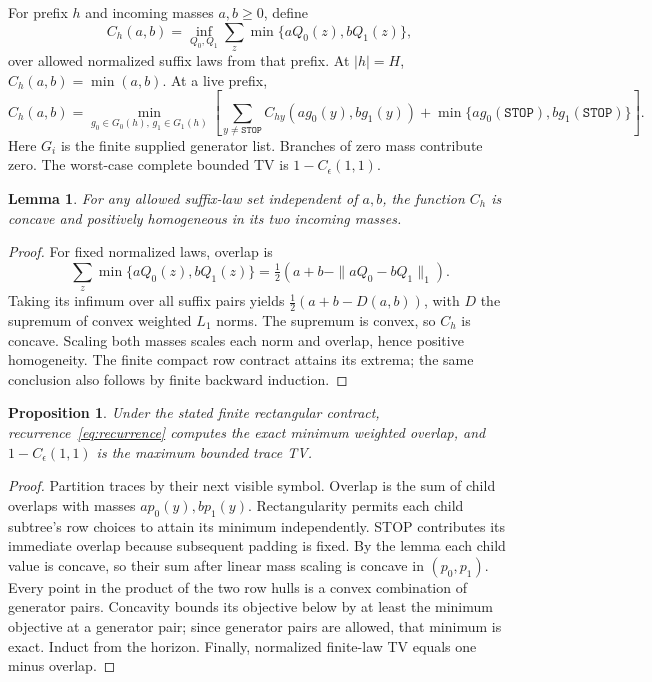 \documentclass[11pt,a4paper]{article}
\newcommand{\STOP}{\mathtt{STOP}}
\newtheorem{proposition}{Proposition}
\newtheorem{lemma}{Lemma}
\begin{document}
For prefix $h$ and incoming masses $a,b\geq0$, define
\[
C_h(a,b)=\inf_{Q_0,Q_1}\sum_z\min\{a Q_0(z),b Q_1(z)\},
\]
over allowed normalized suffix laws from that prefix. At $|h|=H$, $C_h(a,b)=\min(a,b)$. At a live prefix,
\begin{equation}\label{eq:recurrence}
C_h(a,b)=\min_{g_0\in G_0(h),\,g_1\in G_1(h)}
\left[\sum_{y\neq\STOP} C_{hy}(a g_0(y),b g_1(y))
+\min\{a g_0(\STOP),b g_1(\STOP)\}\right].
\end{equation}
Here $G_i$ is the finite supplied generator list. Branches of zero mass contribute zero. The worst-case complete bounded TV is $1-C_\epsilon(1,1)$.

\begin{lemma}
For any allowed suffix-law set independent of $a,b$, the function $C_h$ is concave and positively homogeneous in its two incoming masses.
\end{lemma}
\begin{proof}
For fixed normalized laws, overlap is
\[
\sum_z\min\{aQ_0(z),bQ_1(z)\}
=\tfrac12(a+b-\|aQ_0-bQ_1\|_1).
\]
Taking its infimum over all suffix pairs yields $\tfrac12(a+b-D(a,b))$, with $D$ the supremum of convex weighted $L_1$ norms. The supremum is convex, so $C_h$ is concave. Scaling both masses scales each norm and overlap, hence positive homogeneity. The finite compact row contract attains its extrema; the same conclusion also follows by finite backward induction.
\end{proof}

\begin{proposition}
Under the stated finite rectangular contract, recurrence~\eqref{eq:recurrence} computes the exact minimum weighted overlap, and $1-C_\epsilon(1,1)$ is the maximum bounded trace TV.
\end{proposition}
\begin{proof}
Partition traces by their next visible symbol. Overlap is the sum of child overlaps with masses $ap_0(y),bp_1(y)$. Rectangularity permits each child subtree's row choices to attain its minimum independently. STOP contributes its immediate overlap because subsequent padding is fixed. By the lemma each child value is concave, so their sum after linear mass scaling is concave in $(p_0,p_1)$. Every point in the product of the two row hulls is a convex combination of generator pairs. Concavity bounds its objective below by at least the minimum objective at a generator pair; since generator pairs are allowed, that minimum is exact. Induct from the horizon. Finally, normalized finite-law TV equals one minus overlap.
\end{proof}
\end{document}
